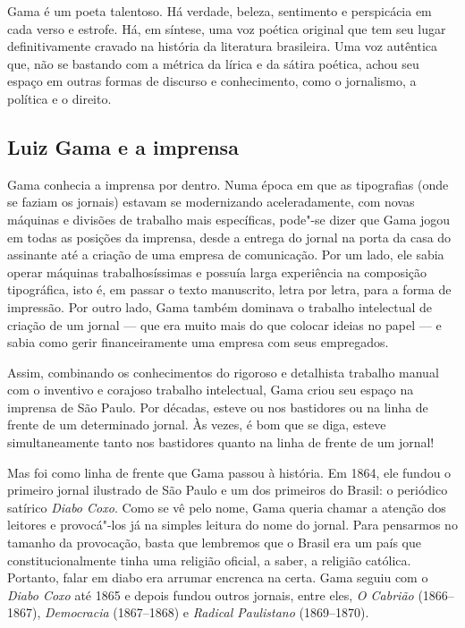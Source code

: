 Gama é um poeta talentoso. Há verdade, beleza, sentimento e perspicácia
em cada verso e estrofe. Há, em síntese, uma voz poética original que
tem seu lugar definitivamente cravado na história da literatura
brasileira. Uma voz autêntica que, não se bastando com a métrica da
lírica e da sátira poética, achou seu espaço em outras formas de
discurso e conhecimento, como o jornalismo, a política e o direito.

\subsection{Luiz Gama e a imprensa}

Gama conhecia a imprensa por dentro. Numa época em que as tipografias
(onde se faziam os jornais) estavam se modernizando aceleradamente, com
novas máquinas e divisões de trabalho mais específicas, pode"-se dizer
que Gama jogou em todas as posições da imprensa, desde a entrega do
jornal na porta da casa do assinante até a criação de uma empresa de
comunicação. Por um lado, ele sabia operar máquinas trabalhosíssimas e
possuía larga experiência na composição tipográfica, isto é, em passar o
texto manuscrito, letra por letra, para a forma de impressão. Por outro
lado, Gama também dominava o trabalho intelectual de criação de um
jornal --- que era muito mais do que colocar ideias no papel --- e sabia
como gerir financeiramente uma empresa com seus empregados.

Assim, combinando os conhecimentos do rigoroso e detalhista trabalho
manual com o inventivo e corajoso trabalho intelectual, Gama criou seu
espaço na imprensa de São Paulo. Por décadas, esteve ou nos bastidores
ou na linha de frente de um determinado jornal. Às vezes, é bom que se
diga, esteve simultaneamente tanto nos bastidores quanto na linha de
frente de um jornal!

Mas foi como linha de frente que Gama passou à história. Em 1864, ele
fundou o primeiro jornal ilustrado de São Paulo e um dos primeiros do
Brasil: o periódico satírico \emph{Diabo Coxo}. Como se vê pelo nome,
Gama queria chamar a atenção dos leitores e provocá"-los já na simples
leitura do nome do jornal. Para pensarmos no tamanho da provocação,
basta que lembremos que o Brasil era um país que constitucionalmente
tinha uma religião oficial, a saber, a religião católica. Portanto,
falar em diabo era arrumar encrenca na certa. Gama seguiu com o
\emph{Diabo Coxo} até 1865 e depois fundou outros jornais, entre eles,
\emph{O Cabrião} (1866--1867), \emph{Democracia} (1867--1868) e
\emph{Radical Paulistano} (1869--1870).

